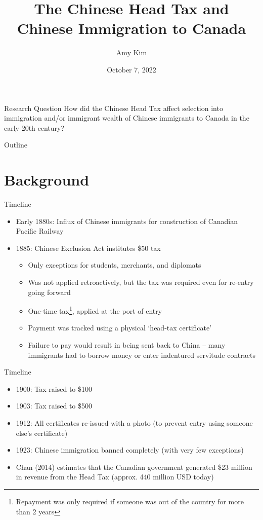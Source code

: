 \documentclass[pdf]{beamer}
\title{The Chinese Head Tax and Chinese Immigration to Canada}
\author{Amy Kim}
\date{October 7, 2022}
\begin{document}
\begin{frame}
    \titlepage
\end{frame}

\begin{frame}{Research Question}
    How did the Chinese Head Tax affect selection into immigration and/or immigrant wealth of Chinese immigrants to Canada in the early 20th century?    
\end{frame}

\begin{frame}{Outline}
    \tableofcontents
\end{frame}


\section{Background}
\begin{frame}{Timeline}
    \begin{itemize}
        \item Early 1880s: Influx of Chinese immigrants for construction of Canadian Pacific Railway
        \item 1885: Chinese Exclusion Act institutes \$50 tax
        \begin{itemize}
            \item Only exceptions for students, merchants, and diplomats
            \item Was not applied retroactively, but the tax was required even for re-entry going forward
            \item One-time tax\footnote{Repayment was only required if someone was out of the country for more than 2 years}, applied at the port of entry
            \item Payment was tracked using a physical `head-tax certificate'
            \item Failure to pay would result in being sent back to China -- many immigrants had to borrow money or enter indentured servitude contracts
        \end{itemize}
    \end{itemize}
\end{frame}

\begin{frame}{Timeline}
    \begin{itemize}
        \item 1900: Tax raised to \$100 
        \item 1903: Tax raised to \$500 
        \item 1912: All certificates re-issued with a photo (to prevent entry using someone else's certificate)
        \item 1923: Chinese immigration banned completely (with very few exceptions)
        \item Chan (2014) estimates that the Canadian government generated \$23 million in revenue from the Head Tax (approx. 440 million USD today)
    \end{itemize}
\end{frame}
\end{document}
